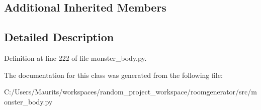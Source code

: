 \subsection*{Additional Inherited Members}


\subsection{Detailed Description}


Definition at line 222 of file monster\+\_\+body.\+py.



The documentation for this class was generated from the following file\+:\begin{DoxyCompactItemize}
\item 
C\+:/\+Users/\+Maurits/workspaces/random\+\_\+project\+\_\+workspace/roomgenerator/src/monster\+\_\+body.\+py\end{DoxyCompactItemize}
